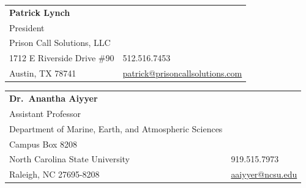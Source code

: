 \documentclass[margin,line]{resume}
\begin{document}
\begin{resume}
\begin{tabular}{@{}p{9cm}p{3cm}}
\textbf{Patrick Lynch}\\
President\\
Prison Call Solutions, LLC\\
1712 E Riverside Drive \#90                 &  512.516.7453\\
Austin, TX 78741                        &  \href{mailto:patrick@prisoncallsolutions.com}{patrick@prisoncallsolutions.com}\\
\end{tabular}

\begin{tabular}{@{}p{9cm}p{3cm}}
\textbf{Dr.\ Anantha Aiyyer}\\
Assistant Professor\\
Department of Marine, Earth, and Atmospheric Sciences\\
Campus Box 8208\\
North Carolina State University                 &  919.515.7973\\
Raleigh, NC  27695-8208                     &  \href{mailto:aaiyyer@ncsu.edu }{aaiyyer@ncsu.edu}\\
\end{tabular}




\end{resume}
\end{document}
